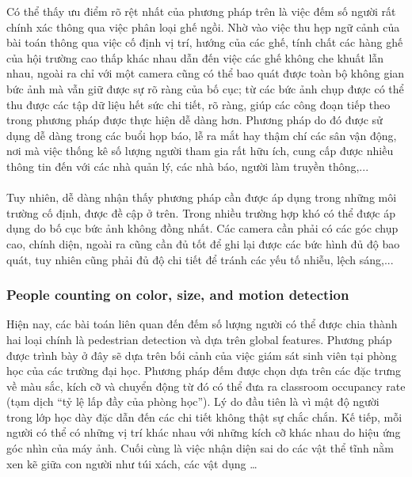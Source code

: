 \documentclass[12pt,a4paper]{article}
\begin{document}
Có thể thấy ưu điểm rõ rệt nhất của phương pháp trên là việc đếm số người rất chính xác thông qua việc phân loại ghế ngồi. Nhờ vào việc thu hẹp ngữ cảnh của bài toán thông qua việc cố định vị trí, hướng của các ghế, tính chất các hàng ghế của hội trường cao thấp khác nhau dẫn đến việc các ghế không che khuất lẫn nhau, ngoài ra chỉ với một camera cũng có thể bao quát được toàn bộ không gian bức ảnh mà vẫn giữ được sự rõ ràng của bố cục; từ các bức ảnh chụp được có thể thu được các tập dữ liệu hết sức chi tiết, rõ ràng, giúp các công đoạn tiếp theo trong phương pháp được thực hiện dễ dàng hơn. Phương pháp do đó được sử dụng dễ dàng trong các buổi họp báo, lễ ra mắt hay thậm chí các sân vận động, nơi mà việc thống kê số lượng người tham gia rất hữu ích, cung cấp được nhiều thông tin đến với các nhà quản lý, các nhà báo, người làm truyền thông,... \\ \\
Tuy nhiên, dễ dàng nhận thấy phương pháp cần được áp dụng trong những môi trường cố định, được đề cập ở trên. Trong nhiều trường hợp khó có thể được áp dụng do bố cục bức ảnh không đồng nhất. Các camera cần phải có các góc chụp cao, chính diện, ngoài ra cũng cần đủ tốt để ghi lại được các bức hình đủ độ bao quát, tuy nhiên cũng phải đủ độ chi tiết để tránh các yếu tố nhiễu, lệch sáng,...





		\subsubsection{People counting on color, size, and motion detection \cite{Base global feature}}
		Hiện nay, các bài toán liên quan đến đếm số lượng người có thể được chia thành hai loại chính là pedestrian detection và dựa trên global features. Phương pháp được trình bày ở đây sẽ dựa trên bối cảnh của việc giám sát sinh viên tại phòng học của các trường đại học. Phương pháp đếm được chọn dựa trên các đặc trưng về màu sắc, kích cỡ và chuyển động từ đó có thể đưa ra classroom occupancy rate (tạm dịch “tỷ lệ lấp đầy của phòng học”). Lý do đầu tiên là vì mật độ người trong lớp học dày đặc dẫn đến các chi tiết không thật sự chắc chắn. Kế tiếp, mỗi người có thể có những vị trí khác nhau với những kích cỡ khác nhau do hiệu ứng góc nhìn của máy ảnh. Cuối cùng là việc nhận diện sai do các vật thể tĩnh nằm xen kẽ giữa con người như túi xách, các vật dụng …\\
\end{document}
